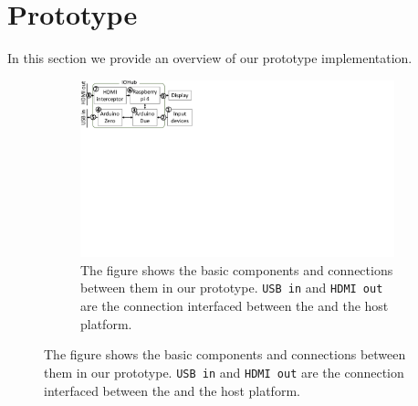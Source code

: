 \section{\name Prototype}
\label{sec:prototype}

In this section we provide an overview of our \name prototype implementation.

\begin{figure}[!htpb]
    \begin{center}
        \begin{subfigure}{\textwidth}
        \centering
            \includegraphics[trim={0 13.7cm 21.7cm 0}, clip, scale=0.5]{chapters/ProtectIOn/images/setUpBlock_1.pdf}
            \caption{The figure shows the basic components and connections between them in our \name \device prototype. \texttt{USB in} and \texttt{HDMI out} are the connection interfaced between the \device and the host platform.}
            \label{fig:prototypeArch}    
        \end{subfigure}
    \end{center}
    
    

\end{figure}
